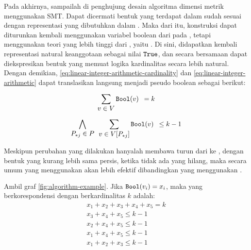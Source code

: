 Pada akhirnya, sampailah di penghujung desain algoritma dimensi metrik menggunakan SMT. Dapat dicermati bentuk  yang terdapat dalam  sudah sesuai dengan representasi  yang dibutuhkan dalam . Maka dari itu, konstruksi  dapat diturunkan kembali menggunakan variabel boolean dari pada , tetapi menggunakan teori yang lebih tinggi dari , yaitu . Di sini, didapatkan kembali representasi natural keanggotaan sebagai nilai \(\mathtt{True}\), dan secara bersamaan dapat diekspresikan bentuk  yang memuat logika kardinalitas secara lebih natural. Dengan demikian, \autoref{eq:linear-integer-arithmetic-cardinality} dan \autoref{eq:linear-integer-arithmetic} dapat translasikan langsung menjadi pseudo boolean sebagai berikut:

\begin{equation}
	\sum \limits_{\displaystyle v \in V} \mathtt{Bool}(v) \enspace = k
	\label{eq:pseudo-boolean-cardinality}
\end{equation}

\begin{equation}
	\bigwedge \limits_{\displaystyle P_{*j} \in P} \enspace \sum \limits_{\displaystyle v \in V[P_{*j}]} \mathtt{Bool}(v) \enspace \leq k - 1
	\label{eq:pseudo-boolean}
\end{equation}

Meskipun perubahan yang dilakukan hanyalah membawa turun dari  ke , dengan bentuk  yang kurang lebih sama persis, ketika tidak ada  yang hilang, maka secara umum  yang menggunakan  akan lebih efektif dibandingkan yang menggunakan .

\begin{example}
	Ambil graf \autoref{fig:algorithm-example}. Jika \(\mathtt{Bool}(v_i) = x_i\), maka  yang berkorespondensi dengan  berkardinalitas \(k\) adalah:
	\[
		\begin{array}{c}
			x_1 + x_2 + x_3 + x_4 + x_5 = k \\ [4pt]
			x_3 + x_4 + x_5 \leq k - 1 \\
			x_2 + x_4 + x_5 \leq k - 1 \\
			x_1 + x_4 + x_5 \leq k - 1 \\
			x_1 + x_2 + x_3 \leq k - 1
		\end{array}
	\]
	\label{ex:pseudo-boolean-constraint}
\end{example}

